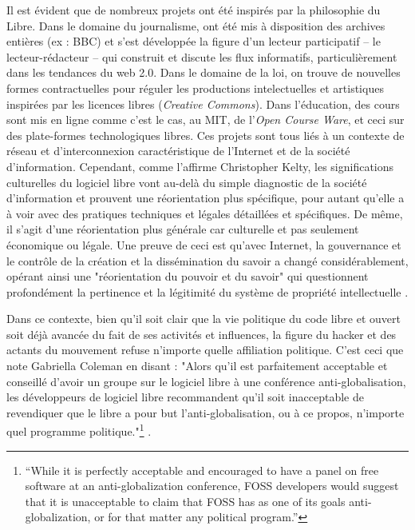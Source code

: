 Il est évident que de nombreux projets ont été inspirés par la philosophie du Libre. Dans le domaine du journalisme, ont été mis à disposition des archives entières (ex : BBC) et s'est développée la figure d'un lecteur participatif -- le lecteur-rédacteur -- qui construit et discute les flux informatifs, particulièrement dans les tendances du web 2.0. Dans le domaine de la loi, on trouve de nouvelles formes contractuelles pour réguler les productions intelectuelles et artistiques inspirées par les licences libres (\emph{Creative Commons}). Dans l'éducation, des cours sont mis en ligne comme c'est le cas, au MIT, de l'\emph{Open Course Ware}, et ceci sur des plate-formes technologiques libres. Ces projets sont tous liés à un contexte de réseau et d'interconnexion caractéristique de l'Internet et de la société d'information. Cependant, comme l'affirme Christopher Kelty, les significations culturelles du logiciel libre vont au-delà du simple diagnostic de la société d'information et prouvent une réorientation plus spécifique, pour autant qu'elle a à voir avec des pratiques techniques et légales détaillées et spécifiques. De même, il s'agit d'une réorientation plus générale car culturelle et pas seulement économique ou légale. Une preuve de ceci est qu'avec Internet, la gouvernance et le contrôle de la création et la dissémination du savoir a changé considérablement, opérant ainsi une "réorientation du pouvoir et du savoir" qui questionnent profondément la pertinence et la légitimité du système de propriété intellectuelle \citep{Kelty2008}.

Dans ce contexte, bien qu'il soit clair que la vie politique du code libre et ouvert soit déjà avancée du fait  de ses activités et influences, la figure du hacker et des actants du mouvement refuse n'importe quelle affiliation politique. C'est ceci que note Gabriella Coleman en disant : "Alors qu'il est parfaitement acceptable et conseillé d'avoir un groupe sur le logiciel libre à une conférence anti-globalisation, les développeurs  de logiciel libre recommandent qu'il soit inacceptable de revendiquer que le libre a pour but l'anti-globalisation, ou à ce propos, n'importe quel programme politique."\footnote{“While it is perfectly acceptable and encouraged to have a panel on free software at an anti-globalization conference, FOSS developers would suggest that it is unacceptable to claim that FOSS has as one of its goals anti-globalization, or for that matter any political program.”} \citep[p.507]{Coleman2004a}.

